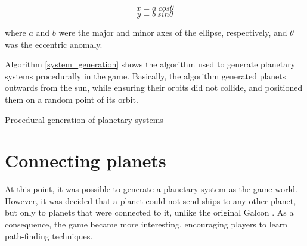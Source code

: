 \documentclass[a4paper,11pt,titlepage,abstract,numbers=noenddot,automark,mnsy,intlimits,rgb,dvipsnames]{report}
\begin{document}
$$x = a \: cos \theta$$
$$y = b \: sin \theta$$

where $a$ and $b$ were the major and minor axes of the ellipse, respectively, and $\theta$ was the eccentric anomaly.

Algorithm \autoref{system_generation} shows the algorithm used to generate planetary systems procedurally in the game.
Basically, the algorithm generated planets outwards from the sun, while ensuring their orbits did not collide,
and positioned them on a random point of its orbit.
\begin{algorithm}
\caption{Procedural generation of planetary systems}
\label{system_generation}
\begin{algorithmic}
\ENDFOR
\end{algorithmic}
\end{algorithm}
\clearpage
\section{Connecting planets}
At this point, it was possible to generate a planetary system as the game world. However, it was decided that a planet
could not send ships to any other planet, but only to planets that were connected to it, unlike the original Galcon \cite{galcon}.
As a consequence, the game became more interesting, encouraging players to learn path-finding techniques.
\end{document}
